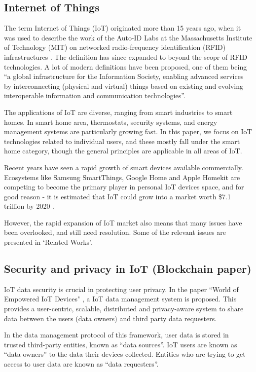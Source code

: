 \subsection{Internet of Things}
The term Internet of Things (IoT) originated more than 15 years ago, when it was used to describe the work of the Auto-ID Labs at the
Massachusetts Institute of Technology (MIT) on networked radio-frequency identification (RFID) infrastructures \cite{atzori}. The definition has since expanded to beyond the scopr of RFID technologies. A lot of modern definitions have been proposed, one of them being ``a global infrastructure for the Information Society, enabling advanced services by interconnecting (physical and virtual) things based on existing and evolving interoperable information and communication technologies''\cite{itu}.

The applications of IoT are diverse, ranging from smart industries to smart homes. In smart home area, thermostats, security systems, and energy management systems are particularly growing fast. In this paper, we focus on IoT technologies related to individual users, and these mostly fall under the smart home category, though the general principles are applicable in all areas of IoT.

Recent years have seen a rapid growth of smart devices available commercially. Ecosystems like Samsung SmartThings, Google Home and Apple Homekit are competing to become the primary player in personal IoT devices space, and for good reason -  it is estimated that IoT could grow into a market worth \$7.1 trillion by 2020 \cite{idc}.

However, the rapid expansion of IoT market also means that many issues have been overlooked, and still need resolution. Some of the relevant issues are presented in `Related Works'.

\subsection{Security and privacy in IoT (Blockchain paper)}
IoT data security is crucial in protecting user privacy. In the paper ``World of Empowered IoT Devices" \cite{campbell}, a IoT data management system is proposed. This provides a user-centric, scalable, distributed and privacy-aware system to share data between the users (data owners) and third party data requesters.

In the data management protocol of this framework, user data is stored in trusted third-party entities, known as “data sources”. IoT users are known as “data owners” to the data their devices collected. Entities who are trying to get access to user data are known as “data requesters”. 

